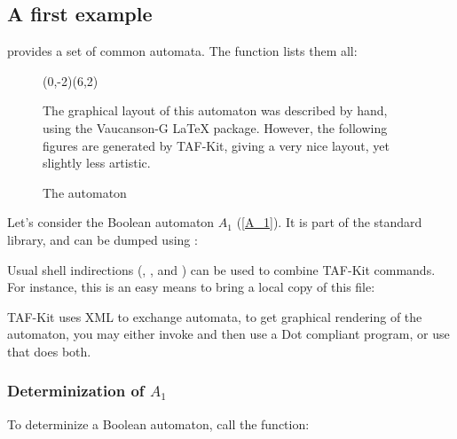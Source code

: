 \subsection{A first example}

\Vauc provides a set of common automata.  The function
 lists them all:


\begin{figure}[ht] \centering
  \begin{VCPicture}{(0,-2)(6,2)}
      
     
     
       
  \end{VCPicture}
  \begin{legend}
    The graphical layout of this automaton was described by hand,
    using the Vaucanson-G \LaTeX{} package.  However, the following
    figures are generated by TAF-Kit, giving a very nice layout, yet
    slightly less artistic.
  \end{legend}
  \caption{The automaton }
  \label{A_1}
\end{figure}

Let's consider the Boolean automaton $A_1$ (\autoref{A_1}).  It is
part of the standard library, and can be dumped using
:


Usual shell indirections (\samp{|}, \samp{>}, and \samp{<}) can be
used to combine TAF-Kit commands.  For instance, this is an easy means
to bring a local copy of this file:


TAF-Kit uses XML to exchange automata, to get graphical rendering of
the automaton, you may either invoke  and then
use a Dot compliant program, or use  that does
both.

\begin{center}
\end{center}


\subsubsection{Determinization of $A_1$}
To determinize a Boolean automaton, call the
 function:

